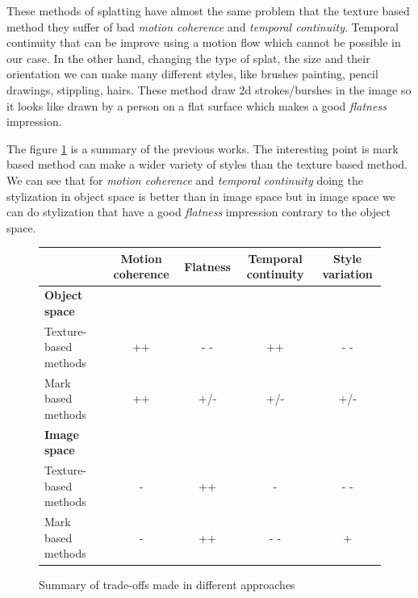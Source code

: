These methods of splatting have almost the same problem that the texture based method they suffer of bad \textit{motion coherence} and \textit{temporal continuity}. Temporal continuity that can be improve using a motion flow which cannot be possible in our case. In the other hand, changing the type of splat, the size and their orientation we can make many different styles, like brushes painting, pencil drawings, stippling, hairs. These method draw 2d strokes/burshes in the image so it looks like drawn by a person on a flat surface which makes a good \textit{flatness} impression. \newline



%

The figure \ref{tableau_comparatif} is a summary of the previous works. The interesting point is mark based method can make a wider variety of styles than the texture based method. We can see that for \textit{motion coherence} and \textit{temporal continuity} doing the stylization in object space is better than in image space but in image space we can do stylization that have a good \textit{flatness} impression contrary to the object space.


\begin{figure}

    \begin{tabular}{|l|*{4}{c|}}
    \hline
         & \textbf{Motion coherence} & \textbf{Flatness} & \textbf{Temporal continuity} & \textbf{Style variation} \\
    \hline
    \textbf{Object space} & & & & \\
    \hline
    Texture-based methods & ++ & - - & ++ & - - \\
    \hline
    Mark based methods & ++ & +/- & +/- & +/- \\
    \hline
    \textbf{Image space} & & & & \\
    \hline
    Texture-based methods & -  & ++ & - & - - \\
    \hline
    Mark based methods & - & ++ & - - & + \\
    \hline
    \end{tabular}

    \caption{Summary of trade-offs made in different approaches}
    \label{tableau_comparatif}
\end{figure}
